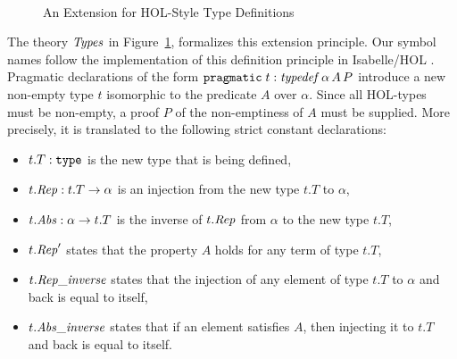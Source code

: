\begin{figure}[ht]
\vspace{-1.5em}
\begin{center}
\begin{twelfsig}
\tsig{\Types}\\
\tmeta{\Forms}{}\\
\decl{\forall}{(\alpha\to\form)\to\form}\\
\decl{\exists}{(\alpha\to\form)\to\form}\\
\decl{\doteq}{(\alpha\to\alpha)\to\form}\\
\\
\tsigend
\end{twelfsig}
\vspace{-1.5em}
\caption{An Extension for HOL-Style Type Definitions}\label{fig:typedef}
\end{center}
\vspace{-1.5em}
\end{figure}

The theory $\mathit{Types}$ in Figure~\ref{fig:typedef}, formalizes this extension principle. Our symbol names follow the implementation of this definition principle in Isabelle/HOL \cite{isabellehol}.
Pragmatic declarations of the form $\mathtt{pragmatic}\;t:\mathit{typedef}\,\alpha\,A\,P$ introduce a new non-empty type $t$ isomorphic to the predicate $A$ over $\alpha$. Since all HOL-types must be non-empty, a proof $P$ of the non-emptiness of $A$ must be supplied. 
More precisely, it is translated to the following strict constant declarations:
\begin{itemize}
\item $t.T: \mathtt{type}$ is the new type that is being defined,
\item $t.\mathit{Rep}: t.T\to\alpha$ is an injection from the new type $t.T$ to $\alpha$,
\item $t.\mathit{Abs}:\alpha\to t.T$ is the inverse of $t.\mathit{Rep}$ from $\alpha$ to the new type $t.T$,
\item $t.\mathit{Rep}'$ states that the property $A$ holds for any term of type $t.T$,
\item $t.\mathit{Rep\_inverse}$ states that the injection of any element of type $t.T$ to $\alpha$ and back is equal to itself,
\item $t.\mathit{Abs\_inverse}$ states that if an element satisfies $A$, then injecting it to $t.T$ and back is equal to itself.
\end{itemize}

